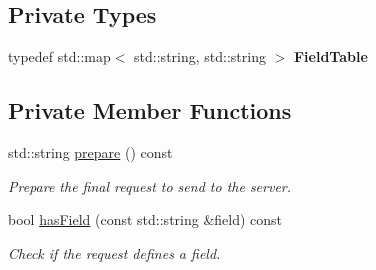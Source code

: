 \subsection*{Private Types}
\begin{DoxyCompactItemize}
\item 
\mbox{\label{classsf_1_1_http_1_1_request_a0a7c6144d2f18977068655c96c8cf298}} 
typedef std\+::map$<$ std\+::string, std\+::string $>$ {\bfseries Field\+Table}
\end{DoxyCompactItemize}
\subsection*{Private Member Functions}
\begin{DoxyCompactItemize}
\item 
std\+::string \mbox{\hyperlink{classsf_1_1_http_1_1_request_a4f53faef789d95aa21d72264adc74fba}{prepare}} () const
\begin{DoxyCompactList}\small\item\em Prepare the final request to send to the server. \end{DoxyCompactList}\item 
bool \mbox{\hyperlink{classsf_1_1_http_1_1_request_a5f54bdf9da421af7bf4eb1a5b0c12447}{has\+Field}} (const std\+::string \&field) const
\begin{DoxyCompactList}\small\item\em Check if the request defines a field. \end{DoxyCompactList}\end{DoxyCompactItemize}
